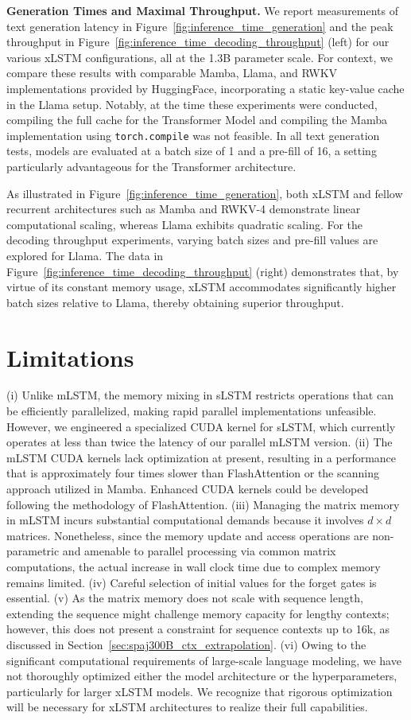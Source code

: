 \textbf{Generation Times and Maximal Throughput.} We report measurements of text generation latency in Figure~\ref{fig:inference_time_generation} and the peak throughput in Figure~\ref{fig:inference_time_decoding_throughput} (left) for our various xLSTM configurations, all at the 1.3B parameter scale. For context, we compare these results with comparable Mamba, Llama, and RWKV implementations provided by HuggingFace, incorporating a static key-value cache in the Llama setup. Notably, at the time these experiments were conducted, compiling the full cache for the Transformer Model and compiling the Mamba implementation using \texttt{torch.compile} was not feasible. In all text generation tests, models are evaluated at a batch size of 1 and a pre-fill of 16, a setting particularly advantageous for the Transformer architecture.

As illustrated in Figure~\ref{fig:inference_time_generation}, both xLSTM and fellow recurrent architectures such as Mamba and RWKV-4 demonstrate linear computational scaling, whereas Llama exhibits quadratic scaling. For the decoding throughput experiments, varying batch sizes and pre-fill values are explored for Llama. The data in Figure~\ref{fig:inference_time_decoding_throughput} (right) demonstrates that, by virtue of its constant memory usage, xLSTM accommodates significantly higher batch sizes relative to Llama, thereby obtaining superior throughput.

\section{Limitations}

(i) Unlike mLSTM, the memory mixing in sLSTM restricts operations that can be efficiently parallelized, making rapid parallel implementations unfeasible. However, we engineered a specialized CUDA kernel for sLSTM, which currently operates at less than twice the latency of our parallel mLSTM version. (ii) The mLSTM CUDA kernels lack optimization at present, resulting in a performance that is approximately four times slower than FlashAttention or the scanning approach utilized in Mamba. Enhanced CUDA kernels could be developed following the methodology of FlashAttention. (iii) Managing the matrix memory in mLSTM incurs substantial computational demands because it involves $d \times d$ matrices. Nonetheless, since the memory update and access operations are non-parametric and amenable to parallel processing via common matrix computations, the actual increase in wall clock time due to complex memory remains limited. (iv) Careful selection of initial values for the forget gates is essential. (v) As the matrix memory does not scale with sequence length, extending the sequence might challenge memory capacity for lengthy contexts; however, this does not present a constraint for sequence contexts up to 16k, as discussed in Section~\ref{sec:spaj300B_ctx_extrapolation}. (vi) Owing to the significant computational requirements of large-scale language modeling, we have not thoroughly optimized either the model architecture or the hyperparameters, particularly for larger xLSTM models. We recognize that rigorous optimization will be necessary for xLSTM architectures to realize their full capabilities.

